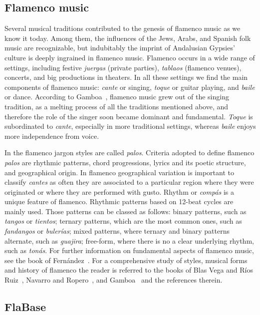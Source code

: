 \subsection{Flamenco music}\label{sec:musicology:flamenco}

Several musical traditions contributed to the genesis of flamenco music as we know it today. Among them, the influences of the Jews, Arabs, and Spanish folk music are recognizable, but indubitably  the imprint of Andalusian Gypsies' culture is deeply ingrained in flamenco music. 
Flamenco occurs in a wide range of settings, including festive \textit{juergas} (private parties), \textit{tablaos} (flamenco venues), concerts, and big productions in theaters. In all these settings we find the main components of flamenco music: \textit{cante} or singing, \textit{toque} or guitar playing, and \textit{baile} or dance. According to Gamboa~\cite{gamboa-05}, flamenco music grew out of the singing tradition, as a melting process of all the traditions mentioned above, and therefore the role of the singer soon became dominant and fundamental. \textit{Toque}  is subordinated to \textit{cante}, especially in more traditional settings, whereas \textit{baile} enjoys more independence from voice. 

In the flamenco jargon styles are called \textit{palos}. Criteria adopted to define flamenco \textit{palos} are rhythmic patterns, chord progressions, lyrics and its poetic structure, and geographical origin. In flamenco geographical variation is important to classify \textit{cantes} as often they are associated to a particular region where they were originated or where they are performed with gusto. 
Rhythm or \textit{comp\'as} is a unique feature of flamenco.
Rhythmic patterns based on 12-beat cycles are mainly used. Those patterns can be classed as follows: binary patterns, such as \textit{tangos} or \textit{tientos}; ternary patterns, which are the most common ones, such as \textit{fandangos} or \textit{buler\'ias}; mixed patterns, where ternary and binary patterns alternate, such as \textit{guajira}; free-form, where there is no a clear underlying rhythm, such as \textit{ton\'as}.
For further information on fundamental aspects of flamenco music, see the book of Fern\'andez~\cite{fer-04}. For a comprehensive study of styles, musical forms and history of flamenco the reader is referred to the books of Blas Vega and R\'ios Ruiz~\cite{bvrr-88}, Navarro and Ropero~\cite{nr-95}, and Gamboa~\cite{gamboa-05} and the references therein.


\subsection{FlaBase}\label{sec:musicology:flabase}

